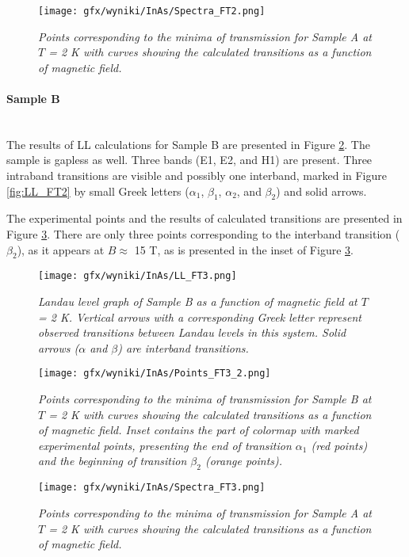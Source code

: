 \documentclass[titlepage,a4paper]{book}
\newcommand{\wciecie}{\quad\phantom{v}}
\newcommand{\myparagraph}[1]{\paragraph{#1}\mbox{}\\}
\begin{document}
\begin{figure}[H]
	\centering
	\texttt{[image: gfx/wyniki/InAs/Spectra\_FT2.png]}
	\vspace{-10pt}
	\caption{\textit{Points corresponding to the minima of transmission for Sample A at $T$ = 2 K with curves showing the calculated transitions as a function of magnetic field.}}
	\label{fig:Spectra_FT2}
\end{figure}

\myparagraph{Sample B}
\wciecie
The results of LL calculations for Sample B are presented in Figure \ref{fig:LL_FT3}. The sample is gapless as well. Three bands (E1, E2, and H1) are present. Three intraband transitions are visible and possibly one interband, marked in Figure \ref{fig:LL_FT2} by small Greek letters ($\alpha_1$, $\beta_1$, $\alpha_2$, and $\beta_2$) and solid arrows. 

The experimental points and the results of calculated transitions are presented in Figure \ref{fig:Points_FT3}. There are only three points corresponding to the interband transition ($\beta_2$), as it appears at $B \approx$ 15 T, as is presented in the inset of Figure \ref{fig:Points_FT3}.  

\begin{figure}[H]
	\centering
	\texttt{[image: gfx/wyniki/InAs/LL\_FT3.png]}
	\vspace{-10pt}
	\caption{\textit{Landau level graph of Sample B as a function of magnetic field at $T$ = 2 K. Vertical arrows with a corresponding Greek letter represent observed transitions between Landau levels in this system. Solid arrows ($\alpha$ and $\beta$) are interband transitions.}}
	\label{fig:LL_FT3}
\end{figure}

\begin{figure}[H]
	\centering
	\texttt{[image: gfx/wyniki/InAs/Points\_FT3\_2.png]}
	\vspace{-10pt}
	\caption{\textit{Points corresponding to the minima of transmission for Sample B at $T$ = 2 K with curves showing the calculated transitions as a function of magnetic field. Inset contains the part of colormap with marked experimental points, presenting the end of transition $\alpha_1$ (red points) and the beginning of transition $\beta_2$ (orange points). }}
	\label{fig:Points_FT3}
\end{figure}

\begin{figure}[H]
	\centering
	\texttt{[image: gfx/wyniki/InAs/Spectra\_FT3.png]}
	\vspace{-10pt}
	\caption{\textit{Points corresponding to the minima of transmission for Sample A at $T$ = 2 K with curves showing the calculated transitions as a function of magnetic field.}}
	\label{fig:Spectra_FT3}
\end{figure}
\end{document}
